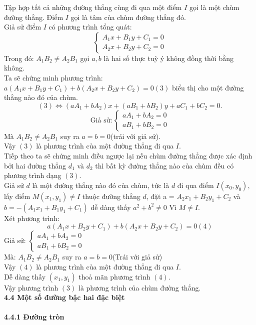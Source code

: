 \documentclass[12pt,a4]{article}
\begin{document}
\begin{titlepage}
\begin{center}
\begin{tikzpicture}[scale=2]
            \end{tikzpicture}
    \end{center}
    Tập hợp tất cả những đường thẳng cùng đi qua một điểm $I$ gọi là một chùm đường thẳng. Điểm $I$ gọi là tâm của chùm đường thẳng đó.\\
    Giả sử điểm $I$ có phương trình tổng quát:
    \[
    \begin{cases} A_1x + B_1y + C_1 = 0\\ A_2x + B_2y + C_2 = 0 \end{cases}
    \]
    Trong đó: $A_1B_2 \neq A_2B_1$ gọi $a,b$ là hai số thực tuỳ ý không đồng thời bằng không.\\
    Ta sẽ chứng minh phương trình: $a(A_1x + B_1y + C_1) + b(A_2x + B_2y + C_2) = 0(3)$ biểu thị cho một đường thẳng nào đó của chùm.
    \[
    (3) \Leftrightarrow (aA_1 + bA_2)x + (aB_1 + bB_2)y + aC_1 + bC_2 = 0.
    \] 
    \[
    \text{Giả sử}: \begin{cases} aA_1 + bA_2 = 0\\ aB_1 + bB_2 = 0\end{cases}
    \]
    Mà $A_1B_2 \neq A_2B_1$ suy ra $a = b = 0$(trái với giả sử).\\
    Vậy $(3)$ là phương trình của một đường thẳng đi qua $I$.\\
    Tiếp theo ta sẽ chứng minh điều ngược lại nếu chùm đường thẳng được xác định bởi hai đường thẳng $d_1$ và $d_2$ thì bất kỳ đường thẳng nào của chùm đều có phương trình dạng $(3)$.\\
    Giả sử $d$ là một đường thẳng nào đó của chùm, tức là $d$ đi qua điểm $I(x_0,y_0),$ lấy điểm $M(x_1,y_1) \neq I$ thuộc đường thẳng $d$, đặt a = $A_2x_1 + B_2y_1 + C_2$ và $b = -(A_1x_1 + B_1y_1 + C_1)$ dễ dàng thấy $a^2 + b^2 \neq 0$ Vì $M \neq I$.\\
    Xét phương trình:
    \[
    a(A_1x + B_2y + C_1) + b(A_2x + B_2y + C_2) = 0 (4)
    \]
    Giả sử: $\begin{cases}aA_1 + bA_2 = 0\\aB_1 + bB_2 = 0 \end{cases}$\\
    Mà: $A_1B_2 \neq A_2B_1$ suy ra $a = b = 0$(Trái với giả sử)\\
    Vậy $(4)$ là phương trình của một đường thẳng đi qua $I$.\\
    Dễ dàng thấy $(x_1,y_1)$ thoả mãn phương trình $(4)$.\\
    Vậy phương trình $(3)$ là phương trình của chùm đường thẳng.\\
    \textbf{4.4 Một số đường bậc hai đặc biệt}\\
    \vspace{0.2cm}\\
    \textbf{4.4.1 Đường tròn}\\
    \vspace{0.2cm}\\
    \begin{center}
        \begin{tikzpicture}[scale=0.5]


\end{tikzpicture}
\end{center}
\end{titlepage}
\end{document}
